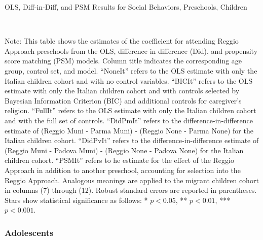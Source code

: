 \begin{landscape}
\begin{table}[H] \caption{OLS, Diff-in-Diff, and PSM Results for Social Behaviors, Preschools, Children} \label{ols-H-reg}
\scalebox{0.77}{
}
\vspace{1ex} \\
\footnotesize\raggedright{Note: This table shows the estimates of the coefficient for attending Reggio Approach preschools from the OLS, difference-in-difference (Did), and propensity score matching (PSM) models. Column title indicates the corresponding age group, control set, and model. ``NoneIt'' refers to the OLS estimate with only the Italian children cohort and with no control variables. ``BICIt'' refers to the OLS estimate with only the Italian children cohort and with controls selected by Bayesian Information Criterion (BIC) and additional controls for caregiver's religion. ``FullIt'' refers to the OLS estimate with only the Italian children cohort and with the full set of controls. ``DidPmIt'' refers to the difference-in-difference estimate of (Reggio Muni - Parma Muni) - (Reggio None - Parma None) for the Italian children cohort. ``DidPvIt'' refers to the difference-in-difference estimate of (Reggio Muni - Padova Muni) - (Reggio None - Padova None) for the Italian children cohort. ``PSMIt'' refers to he estimate for the effect of the Reggio Approach in addition to another preschool, accounting for selection into the Reggio Approach. Analogous meanings are applied to the migrant children cohort in columns (7) through (12). Robust standard errors are reported in parentheses. Stars show statistical significance as follows: * $p < 0.05$, ** $p < 0.01$, *** $p < 0.001$.}
\end{table}
\end{landscape}


\subsubsection{Adolescents}

